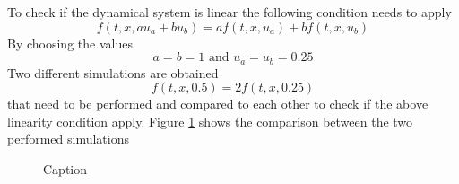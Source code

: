 To check if the dynamical system is linear the following condition needs to apply
$$
f(t,x,au_a+bu_b) = af(t,x,u_a) + bf(t,x,u_b)
$$
By choosing the values 
$$
a = b = 1 \text{ and } u_a = u_b = 0.25
$$
Two different simulations are obtained
$$
f(t,x,0.5) = 2f(t,x,0.25)
$$
that need to be performed and compared to each other to check if the above linearity condition apply.
Figure \ref{fig:LinComp} shows the comparison between the two performed simulations

\begin{figure}[ht]
    \centering
    
    \caption{Caption}
    \label{fig:LinComp}
\end{figure}
